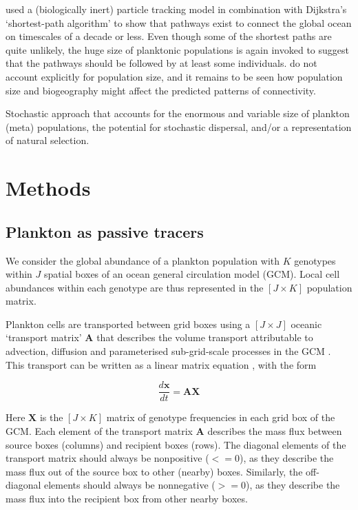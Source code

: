\documentclass[12pt]{article}
\begin{document}
\citet{Jonsson:2016} used a (biologically inert) particle tracking model in combination with Dijkstra's `shortest-path algorithm' \citet[][]{Dijkstra:1959} to show that pathways exist to connect the global ocean on timescales of a decade or less. Even though some of the shortest paths are quite unlikely, the huge size of planktonic populations is again invoked to suggest that the pathways should be followed by at least some individuals.  \citet{Jonsson:2016} do not account explicitly for population size, and it remains to be seen how population size and biogeography might affect the predicted patterns of connectivity.


Stochastic approach that accounts for the enormous and variable size of plankton (meta) populations, the potential for stochastic dispersal, and/or a representation of natural selection.

\section{Methods}

\subsection{Plankton as passive tracers}

We consider the global abundance of a plankton population with $K$ genotypes within $J$ spatial boxes of an ocean general circulation model (GCM). Local cell abundances within each genotype are thus represented in the $[J\times K]$ population matrix.

Plankton cells are transported between grid boxes using a $[J\times J]$ oceanic `transport matrix' $\mathbf{A}$ that describes the volume transport attributable to advection, diffusion and parameterised sub-grid-scale processes in the GCM \cite{Khatiwala:2005}. This transport can be written as a linear matrix equation \cite{Khatiwala:2005}, with the form

\begin{equation}
\frac{d\mathbf{x}}{dt} = \mathbf{A}\mathbf{X}
\end{equation}

Here $\mathbf{X}$ is the $[J\times K]$ matrix of genotype frequencies in each grid box of the GCM. Each element of the transport matrix $\mathbf{A}$ describes the mass flux between source boxes (columns) and recipient boxes (rows). The diagonal elements of the transport matrix should always be nonpositive ($<=0$), as they describe the mass flux out of the source box to other (nearby) boxes. Similarly, the off-diagonal elements should always be nonnegative ($>=0$), as they describe the mass flux into the recipient box from other nearby boxes. 
\end{document}
